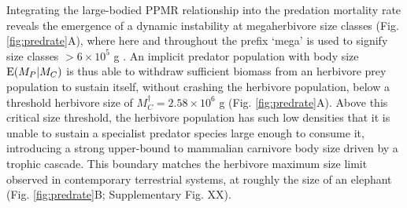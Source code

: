 \documentclass[]{rsos}%
\begin{document}

Integrating the large-bodied PPMR relationship into the predation mortality rate reveals the emergence of a dynamic instability at megaherbivore size classes (Fig. \ref{fig:predrate}A), where here and throughout the prefix `mega' is used to signify size classes $>6\times10^5$ g \cite{Hayward2005}.
An implicit predator population with body size ${\rm E}(M_P|M_C)$ is thus able to withdraw sufficient biomass from an herbivore prey population to sustain itself, without crashing the herbivore population, below a threshold herbivore size of $M_C^\dagger = 2.58\times 10^6$ g (Fig. \ref{fig:predrate}A).
Above this critical size threshold, the herbivore population has such low densities that it is unable to sustain a specialist predator species large enough to consume it, introducing a strong upper-bound to mammalian carnivore body size driven by a trophic cascade.
This boundary matches the herbivore maximum size limit observed in contemporary terrestrial systems, at roughly the size of an elephant \cite{Sinclair2003} (Fig. \ref{fig:predrate}B; Supplementary Fig. XX).
\end{document}
